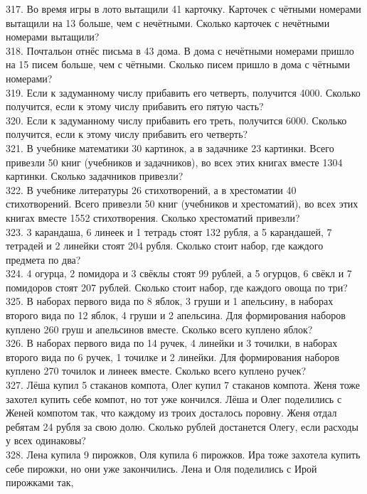 \documentclass[12pt]{article}
\begin{document}
317. Во время игры в лото вытащили 41 карточку. Карточек с чётными номерами вытащили на 13 больше, чем с нечётными. Сколько карточек с нечётными номерами вытащили?\\
318. Почтальон отнёс письма в 43 дома. В дома с нечётными номерами пришло на 15 писем больше, чем с чётными. Сколько писем пришло в дома с чётными номерами?\\
319. Если к задуманному числу прибавить его четверть, получится 4000. Сколько получится, если к этому числу прибавить его пятую часть?\\
320. Если к задуманному числу прибавить его треть, получится 6000. Сколько получится, если к этому числу прибавить его четверть?\\
321. В учебнике математики 30 картинок, а в задачнике 23 картинки. Всего привезли 50 книг (учебников и задачников), во всех этих книгах вместе 1304 картинки.
Сколько задачников привезли?\\
322. В учебнике литературы 26 стихотворений, а в хрестоматии 40 стихотворений. Всего привезли 50 книг (учебников и хрестоматий), во всех этих книгах вместе
1552 стихотворения. Сколько хрестоматий привезли?\\
323. 3 карандаша, 6 линеек и 1 тетрадь стоят 132 рубля, а 5 карандашей, 7 тетрадей и 2 линейки стоят 204 рубля. Сколько стоит набор, где каждого предмета по два?\\
324. 4 огурца, 2 помидора и 3 свёклы стоят 99 рублей, а 5 огурцов, 6 свёкл и 7 помидоров стоят 207 рублей. Сколько стоит набор, где каждого овоща по три?\\
325. В наборах первого вида по 8 яблок, 3 груши и 1 апельсину, в наборах второго вида по 12 яблок, 4 груши и 2 апельсина. Для формирования наборов куплено
260 груш и апельсинов вместе. Сколько всего куплено яблок?\\
326. В наборах первого вида по 14 ручек, 4 линейки и 3 точилки, в наборах второго вида по 6 ручек, 1 точилке и 2 линейки. Для формирования наборов куплено
270 точилок и линеек вместе. Сколько всего куплено ручек?\\
327. Лёша купил 5 стаканов компота, Олег купил 7 стаканов компота. Женя тоже захотел купить себе компот, но тот уже кончился. Лёша и Олег поделились с Женей компотом так, что каждому из троих досталось поровну. Женя отдал ребятам 24 рубля за свою долю. Сколько рублей достанется Олегу, если расходы у всех одинаковы?\\
328. Лена купила 9 пирожков, Оля купила 6 пирожков. Ира тоже захотела купить себе пирожки, но они уже закончились. Лена и Оля поделились с Ирой пирожками так,
\end{document}
